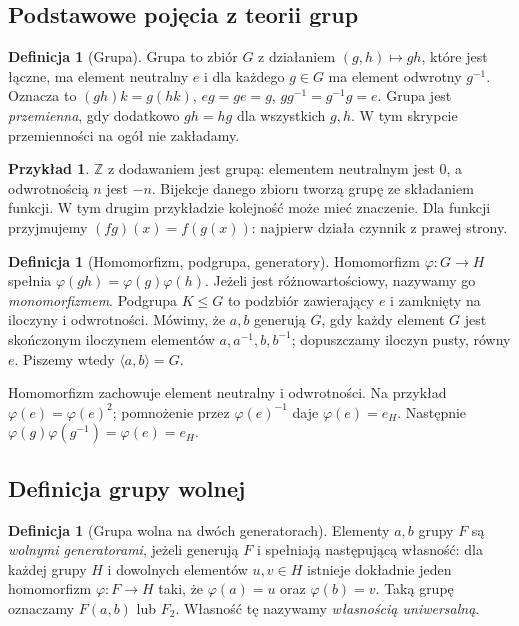 \documentclass[11pt,a4paper]{article}
\numberwithin{equation}{section}
\theoremstyle{plain}
\theoremstyle{definition}
\newtheorem{definicja}[twierdzenie]{Definicja}
\newtheorem{przyklad}[twierdzenie]{Przykład}
\theoremstyle{remark}
\newcommand{\Z}{\mathbb Z}
\begin{document}
\subsection{Podstawowe pojęcia z teorii grup}
\begin{definicja}[Grupa]
Grupa to zbiór $G$ z działaniem $(g,h)\mapsto gh$, które jest łączne, ma element neutralny $e$ i dla każdego $g\in G$ ma element odwrotny $g^{-1}$. Oznacza to $(gh)k=g(hk)$, $eg=ge=g$, $gg^{-1}=g^{-1}g=e$. Grupa jest \emph{przemienna}, gdy dodatkowo $gh=hg$ dla wszystkich $g,h$. W tym skrypcie przemienności na ogół nie zakładamy.
\end{definicja}
\begin{przyklad}
$\Z$ z dodawaniem jest grupą: elementem neutralnym jest $0$, a odwrotnością $n$ jest $-n$. Bijekcje danego zbioru tworzą grupę ze składaniem funkcji. W tym drugim przykładzie kolejność może mieć znaczenie. Dla funkcji przyjmujemy $(fg)(x)=f(g(x))$: najpierw działa czynnik z prawej strony.
\end{przyklad}
\begin{definicja}[Homomorfizm, podgrupa, generatory]
Homomorfizm $\varphi:G\to H$ spełnia $\varphi(gh)=\varphi(g)\varphi(h)$. Jeżeli jest różnowartościowy, nazywamy go \emph{monomorfizmem}. Podgrupa $K\le G$ to podzbiór zawierający $e$ i zamknięty na iloczyny i odwrotności. Mówimy, że $a,b$ generują $G$, gdy każdy element $G$ jest skończonym iloczynem elementów $a,a^{-1},b,b^{-1}$; dopuszczamy iloczyn pusty, równy $e$. Piszemy wtedy $\langle a, b\rangle=G.$
\end{definicja}
Homomorfizm zachowuje element neutralny i odwrotności. Na przykład $\varphi(e)=\varphi(e)^2$; pomnożenie przez $\varphi(e)^{-1}$ daje $\varphi(e)=e_H$. Następnie $\varphi(g)\varphi(g^{-1})=\varphi(e)=e_H$.

\subsection{Definicja grupy wolnej}
\begin{definicja}[Grupa wolna na dwóch generatorach]
\label{def:grupa-wolna}
Elementy $a,b$ grupy $F$ są \emph{wolnymi generatorami},
jeżeli generują $F$ i spełniają następującą własność: dla każdej grupy
$H$ i dowolnych elementów $u,v\in H$ istnieje dokładnie jeden homomorfizm
$\varphi:F\to H$ taki, że $\varphi(a)=u$ oraz $\varphi(b)=v$.
Taką grupę oznaczamy $F(a,b)$ lub $F_2$. Własność tę nazywamy
\emph{własnością uniwersalną}.
\end{definicja}
\end{document}
